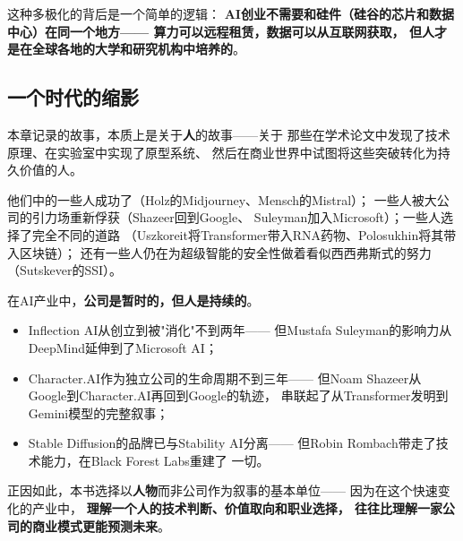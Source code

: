 这种多极化的背后是一个简单的逻辑：
\textbf{AI创业不需要和硅件（硅谷的芯片和数据中心）在同一个地方——
算力可以远程租赁，数据可以从互联网获取，
但人才是在全球各地的大学和研究机构中培养的}。

\subsection{一个时代的缩影}

本章记录的故事，本质上是关于\textbf{人}的故事——关于
那些在学术论文中发现了技术原理、在实验室中实现了原型系统、
然后在商业世界中试图将这些突破转化为持久价值的人。

他们中的一些人成功了（Holz的Midjourney、Mensch的Mistral）；
一些人被大公司的引力场重新俘获（Shazeer回到Google、
Suleyman加入Microsoft）；一些人选择了完全不同的道路
（Uszkoreit将Transformer带入RNA药物、Polosukhin将其带入区块链）；
还有一些人仍在为超级智能的安全性做着看似西西弗斯式的努力
（Sutskever的SSI）。

\begin{whybox}[为什么追踪人物轨迹比追踪公司更重要？]
在AI产业中，\textbf{公司是暂时的，但人是持续的}。
\begin{itemize}
  \item Inflection AI从创立到被"消化"不到两年——
    但Mustafa Suleyman的影响力从DeepMind延伸到了Microsoft AI；
  \item Character.AI作为独立公司的生命周期不到三年——
    但Noam Shazeer从Google到Character.AI再回到Google的轨迹，
    串联起了从Transformer发明到Gemini模型的完整叙事；
  \item Stable Diffusion的品牌已与Stability AI分离——
    但Robin Rombach带走了技术能力，在Black Forest Labs重建了
    一切。
\end{itemize}
正因如此，本书选择以\textbf{人物}而非公司作为叙事的基本单位——
因为在这个快速变化的产业中，
\textbf{理解一个人的技术判断、价值取向和职业选择，
往往比理解一家公司的商业模式更能预测未来}。
\end{whybox}
